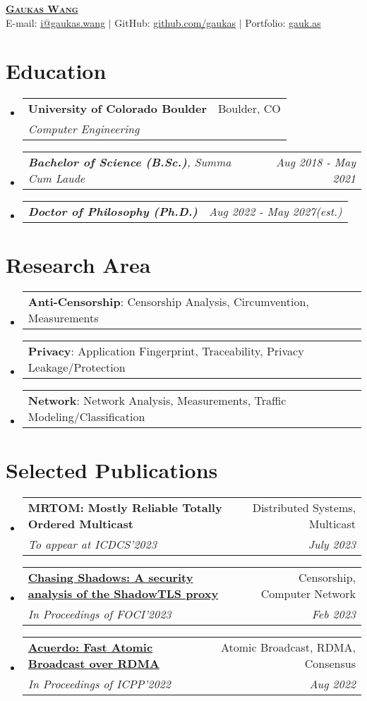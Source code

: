 \documentclass[letterpaper,11pt]{article}
\makeatletter
\newcommand{\resumeSubheading}[4]{
  \vspace{-2pt}\item
    \begin{tabular*}{0.97\textwidth}[t]{l@{\extracolsep{\fill}}r}
      \textbf{#1} & #2 \\
      \textit{\small#3} & \textit{\small #4} \\
    \end{tabular*}\vspace{-7pt}
}
\newcommand{\resumeSubSubheading}[2]{
    \item
    \begin{tabular*}{0.97\textwidth}{l@{\extracolsep{\fill}}r}
      \textit{\small#1} & \textit{\small #2} \\
    \end{tabular*}\vspace{-7pt}
}
\newcommand{\resumeProjectHeading}[2]{
    \item
    \begin{tabular*}{0.97\textwidth}{l@{\extracolsep{\fill}}r}
      \small#1 & #2 \\
    \end{tabular*}\vspace{-7pt}
}
\newcommand{\resumeSubHeadingListStart}{\begin{itemize}[leftmargin=0.15in, label={}]}
\newcommand{\resumeSubHeadingListEnd}{\end{itemize}}
\makeatother
\begin{document}
\begin{center}
  \href{https://gaukas.wang}{\textbf{\Huge \scshape Gaukas Wang}} \\ \vspace{1pt}
    E-mail: \href{mailto:i@gaukas.wang}{{i@gaukas.wang}} $|$ 
    GitHub: \href{https://github.com/gaukas}{{github.com/gaukas}} $|$ 
    Portfolio: \href{https://gauk.as}{gauk.as}
\end{center}


\section{Education}
\resumeSubHeadingListStart
\resumeSubheading
{University of Colorado Boulder}{Boulder, CO}
{Computer Engineering}{}
\resumeSubSubheading
{\textbf{Bachelor of Science (B.Sc.)}, {Summa Cum Laude}}{Aug 2018 - May 2021}
\resumeSubSubheading
{\textbf{Doctor of Philosophy (Ph.D.)}}{Aug 2022 - May 2027\textit{(est.)}}
\resumeSubHeadingListEnd

\vspace{1pt}

\section{Research Area}
\resumeSubHeadingListStart

\resumeProjectHeading
{\textbf{Anti-Censorship}: Censorship Analysis, Circumvention, Measurements}{}

\resumeProjectHeading
{\textbf{Privacy}: Application Fingerprint, Traceability, Privacy Leakage/Protection}{}

\resumeProjectHeading
{\textbf{Network}: Network Analysis, Measurements, Traffic Modeling/Classification}{}

\resumeSubHeadingListEnd
\vspace{1pt}

\section{Selected Publications}
\resumeSubHeadingListStart
  \resumeSubheading
  {\textbf{MRTOM: Mostly Reliable Totally Ordered Multicast}}{Distributed Systems, Multicast}
  {To appear at ICDCS'2023}{July 2023}
  \resumeSubheading
  {\href{https://www.petsymposium.org/foci/2023/foci-2023-0002.php}{\textbf{Chasing Shadows: A security analysis of the ShadowTLS proxy}}}{Censorship, Computer Network}
  {In Proceedings of FOCI'2023}{Feb 2023}
  \resumeSubheading
  {\href{https://dl.acm.org/doi/abs/10.1145/3545008.3545041}{\textbf{Acuerdo: Fast Atomic Broadcast over RDMA}}}{Atomic Broadcast, RDMA, Consensus}
  {In Proceedings of ICPP'2022}{Aug 2022}
\resumeSubHeadingListEnd
\vspace{1pt}
\end{document}
